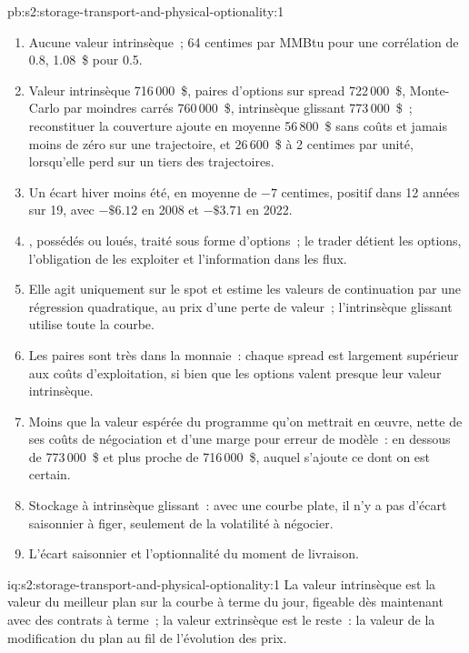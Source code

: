 \begin{solution}{pb:s2:storage-transport-and-physical-optionality:1}
\begin{enumerate}
\item Aucune valeur intrinsèque~; 64 centimes par MMBtu pour une corrélation de 0.8, 1.08~\$ pour 0.5.
\item Valeur intrinsèque 716\,000~\$, paires d'options sur spread 722\,000~\$, Monte-Carlo par moindres carrés 760\,000~\$, intrinsèque glissant 773\,000~\$~; reconstituer la couverture ajoute
en moyenne 56\,800~\$ sans coûts et jamais moins de zéro sur une trajectoire, et 26\,600~\$ à 2 centimes par unité, lorsqu'elle perd sur un tiers des trajectoires.
\item Un écart hiver moins été, en moyenne de $-7$ centimes, positif dans 12 années sur 19, avec $-\$6.12$ en 2008 et $-\$3.71$ en 2022.
\item {}, possédés ou loués, traité sous forme d'options~; le trader détient les options, l'obligation de les exploiter et l'information
dans les flux.
\item Elle agit uniquement sur le spot et estime les valeurs de continuation par une régression quadratique, au prix d'une perte de valeur~; l'intrinsèque glissant utilise toute la courbe.
\item Les paires sont très dans la monnaie~: chaque spread est largement supérieur aux coûts d'exploitation, si bien que les options valent presque leur valeur intrinsèque.
\item Moins que la valeur espérée du programme qu'on mettrait en œuvre, nette de ses coûts de négociation et d'une marge pour erreur de modèle~: en dessous de 773\,000~\$
et plus proche de 716\,000~\$, auquel s'ajoute ce dont on est certain.
\item Stockage à intrinsèque glissant~: avec une courbe plate, il n'y a pas d'écart saisonnier à figer, seulement de la volatilité à négocier.
\item L'écart saisonnier et l'optionnalité du moment de livraison.
\end{enumerate}
\end{solution}

\begin{solution}{iq:s2:storage-transport-and-physical-optionality:1}
La valeur intrinsèque est la valeur du meilleur plan sur la courbe à terme du jour, figeable dès maintenant avec des contrats à terme~; la valeur extrinsèque est le reste~: la valeur de la modification du
plan au fil de l'évolution des prix.
\end{solution}

